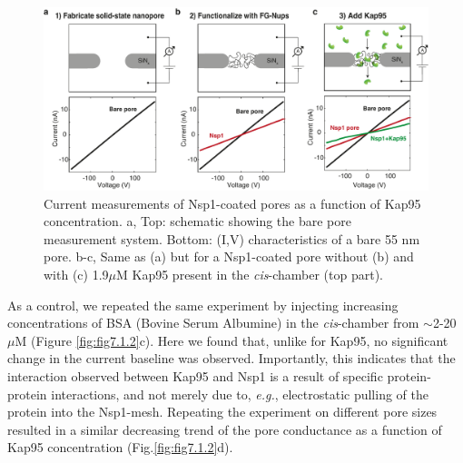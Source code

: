 \begin{figure}[!htbp]
	\centering
	\includegraphics[width=1\linewidth]{figures/Figure7.1.1.pdf}
	\caption{Current measurements of Nsp1-coated pores as a function of Kap95 concentration. a,  Top: schematic showing the bare pore measurement system. Bottom: (I,V) characteristics of a bare 55 nm pore. b-c,  Same as (a) but for a Nsp1-coated pore without (b) and with (c) 1.9$\mu$M Kap95 present in the \emph{cis}-chamber (top part).}
	\label{fig:fig7.1.1}
\end{figure}

As a control, we repeated the same experiment by injecting increasing concentrations of BSA (Bovine Serum Albumine) in the \emph{cis}-chamber from $\sim$2-20 $\mu$M (Figure \ref{fig:fig7.1.2}c). Here we found that, unlike for Kap95, no significant change in the current baseline was observed. Importantly, this indicates that the interaction observed between Kap95 and Nsp1 is a result of specific protein-protein interactions, and not merely due to, \emph{e.g.}, electrostatic pulling of the protein into the Nsp1-mesh. Repeating the experiment on different pore sizes resulted in a similar decreasing trend of the pore conductance as a function of Kap95 concentration (Fig.\ref{fig:fig7.1.2}d). 


